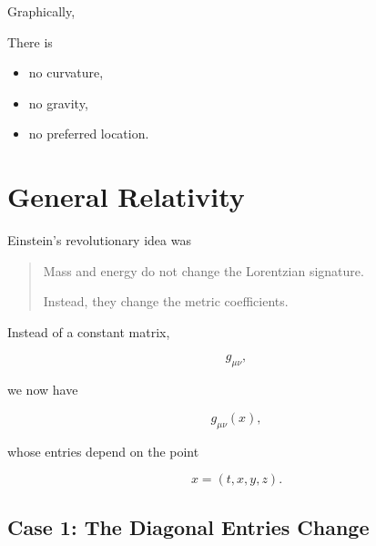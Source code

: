 \documentclass[12pt,a4paper]{article}
\theoremstyle{notespace}
\begin{document}
\bigskip

Graphically,

\begin{center}
	\setlength{\fboxsep}{10pt}
\end{center}

There is

\begin{itemize}
	\item no curvature,
	\item no gravity,
	\item no preferred location.
\end{itemize}


\section{General Relativity}

Einstein's revolutionary idea was

\begin{quote}
	Mass and energy do not change the Lorentzian signature.
	
	Instead, they change the metric coefficients.
\end{quote}

Instead of a constant matrix,

\[
g_{\mu\nu},
\]

we now have

\[
g_{\mu\nu}(x),
\]

whose entries depend on the point

\[
x=(t,x,y,z).
\]


\subsection{Case 1: The Diagonal Entries Change}
\end{document}
